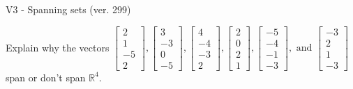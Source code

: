 \begin{exercise}
  \begin{exerciseTitle}V3 - Spanning sets (ver. 299)\end{exerciseTitle}
  \begin{exerciseStatement}
    Explain why the vectors \(\left[\begin{array}{r}
2 \\
1 \\
-5 \\
2
\end{array}\right] , \left[\begin{array}{r}
3 \\
-3 \\
0 \\
-5
\end{array}\right] , \left[\begin{array}{r}
4 \\
-4 \\
-3 \\
2
\end{array}\right] , \left[\begin{array}{r}
2 \\
0 \\
2 \\
1
\end{array}\right] , \left[\begin{array}{r}
-5 \\
-4 \\
-1 \\
-3
\end{array}\right] , \text{ and } \left[\begin{array}{r}
-3 \\
2 \\
1 \\
-3
\end{array}\right]\) span or don't span \(\mathbb{R}^4\). 
	



\end{exerciseStatement}
\end{exercise}
